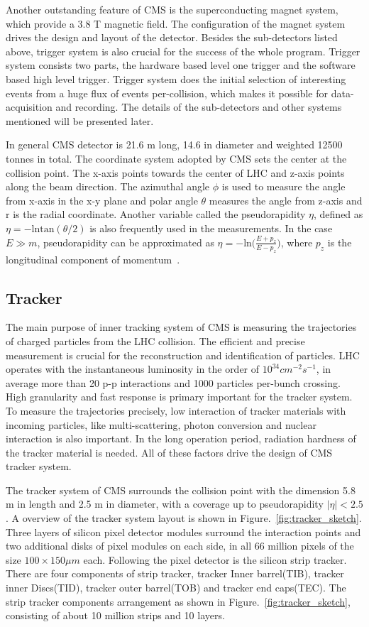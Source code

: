 Another outstanding feature of CMS is the superconducting magnet system, which provide a 3.8 T magnetic field. The configuration of the magnet system drives the design and layout of the detector. Besides the sub-detectors listed above, trigger system is also crucial for the success of the whole program. Trigger system consists two parts, the hardware based level one trigger and the software based high level trigger. Trigger system does the initial selection of interesting events from a huge flux of events per-collision, which makes it possible for data-acquisition and recording. The details of the sub-detectors and other systems mentioned will be presented later. 

In general CMS detector is 21.6 m long, 14.6 in diameter and weighted 12500 tonnes in total. The coordinate system adopted by CMS sets the center at the collision point. The x-axis points towards the center of LHC and z-axis points along the beam direction. The azimuthal angle $\phi$ is used to measure the angle from x-axis in the x-y plane and polar angle $\theta$ measures the angle from z-axis and r is the radial coordinate. Another variable called the pseudorapidity $\eta$, defined as $\eta=-\textrm{ln}\textrm{tan}(\theta/2)$ is also frequently used in the measurements. In the case $E\gg m$, pseudorapidity can be approximated as $\eta=-\textrm{ln}\big(\frac{E+p_{z}}{E-p_{z}}\big)$, where $p_{z}$ is the longitudinal component of momentum~\cite{CMS_experiment}. 

\subsection{Tracker}
The main purpose of inner tracking system of CMS is measuring the trajectories of charged particles from the LHC collision. The efficient and precise measurement is crucial for the reconstruction and identification of particles. LHC operates with the instantaneous luminosity in the order of $10^{34}cm^{-2}s^{-1}$, in average more than 20 p-p interactions and 1000 particles per-bunch crossing. High granularity and fast response is primary important for the tracker system. To measure the trajectories precisely, low interaction of tracker materials with incoming particles, like multi-scattering, photon conversion and nuclear interaction is also important. In the long operation period, radiation hardness of the tracker material is needed. All of these factors drive the design of CMS tracker system.

The tracker system of CMS surrounds the collision point with the dimension 5.8 m in length and 2.5 m in diameter, with a coverage up to pseudorapidity $|\eta|<2.5$. A overview of the tracker system layout is shown in Figure.~\ref{fig:tracker_sketch}. Three layers of silicon pixel detector modules surround the interaction points and two additional disks of pixel modules on each side, in all 66 million pixels of the size $100\times150 \mu m$ each. Following the pixel detector is the silicon strip tracker. There are four components of strip tracker, tracker Inner barrel(TIB), tracker inner Discs(TID), tracker outer barrel(TOB) and tracker end caps(TEC). The strip tracker components arrangement as shown in Figure.~\ref{fig:tracker_sketch}, consisting of about 10 million strips and 10 layers. 



